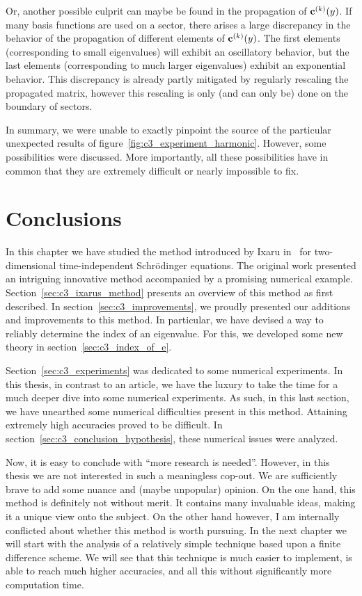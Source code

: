 Or, another possible culprit can maybe be found in the propagation of $\vb{c}^{(k)}(y)$. If many basis functions are used on a sector, there arises a large discrepancy in the behavior of the propagation of different elements of $\vb{c}^{(k)}(y)$. The first elements (corresponding to small eigenvalues) will exhibit an oscillatory behavior, but the last elements (corresponding to much larger eigenvalues) exhibit an exponential behavior. This discrepancy is already partly mitigated by regularly rescaling the propagated matrix, however this rescaling is only (and can only be) done on the boundary of sectors.

In summary, we were unable to exactly pinpoint the source of the particular unexpected results of figure~\ref{fig:c3_experiment_harmonic}. However, some possibilities were discussed. More importantly, all these possibilities have in common that they are extremely difficult or nearly impossible to fix.


\section{Conclusions}

In this chapter we have studied the method introduced by Ixaru in~\cite{ixaru_new_2010} for two-dimensional time-independent Schrödinger equations. The original work presented an intriguing innovative method accompanied by a promising numerical example. Section~\ref{sec:c3_ixarus_method} presents an overview of this method as first described. In section~\ref{sec:c3_improvements}, we proudly presented our additions and improvements to this method. In particular, we have devised a way to reliably determine the index of an eigenvalue. For this, we developed some new theory in section~\ref{sec:c3_index_of_e}.

Section~\ref{sec:c3_experiments} was dedicated to some numerical experiments. In this thesis, in contrast to an article, we have the luxury to take the time for a much deeper dive into some numerical experiments. As such, in this last section, we have unearthed some numerical difficulties present in this method. Attaining extremely high accuracies proved to be difficult. In section~\ref{sec:c3_conclusion_hypothesis}, these numerical issues were analyzed.

Now, it is easy to conclude with ``more research is needed''. However, in this thesis we are not interested in such a meaningless cop-out. We are sufficiently brave to add some nuance and (maybe unpopular) opinion. On the one hand, this method is definitely not without merit. It contains many invaluable ideas, making it a unique view onto the subject. On the other hand however, I am internally conflicted about whether this method is worth pursuing. In the next chapter we will start with the analysis of a relatively simple technique based upon a finite difference scheme. We will see that this technique is much easier to implement, is able to reach much higher accuracies, and all this without significantly more computation time.

